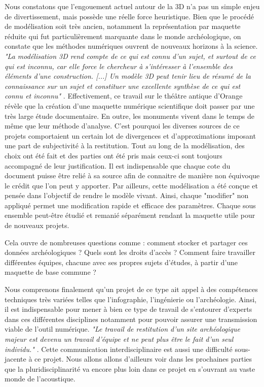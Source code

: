 Nous constatons que l'engouement actuel autour de la 3D n'a pas un simple enjeu de divertissement, mais possède une réelle force heuristique. Bien que le procédé de modélisation soit très ancien, notamment la représentation par maquette réduite qui fut particulièrement marquante dans le monde archéologique, on constate que les méthodes numériques ouvrent de nouveaux horizons à la science. \textit{"La modélisation 3D rend compte de ce qui est connu d’un sujet, et surtout de ce qui est inconnu, car elle force le chercheur à s’intéresser à l’ensemble des éléments d’une construction. [...] Un modèle 3D peut tenir lieu de résumé de la connaissance sur un sujet et constituer une excellente synthèse de ce qui est connu et inconnu"}  \cite{rocheleau}. Effectivement, ce travail sur le théâtre antique d'Orange révèle que la création d'une maquette numérique scientifique doit passer par une très large étude documentaire. En outre, les monuments vivent dans le temps de même que leur méthode d'analyse. C'est pourquoi les diverses sources de ce projets comportaient un certain lot de divergences et d'approximations imposant une part de subjectivité à la restitution. Tout au long de la modélisation, des choix ont été fait et des parties ont été pris mais ceux-ci sont toujours accompagné de leur justification. Il est indispensable que chaque cote du document puisse être relié à sa source afin de connaitre de manière non équivoque le crédit que l'on peut y apporter. 
Par ailleurs, cette modélisation a été conçue et pensée dans l'objectif de rendre le modèle vivant. Ainsi, chaque "modifier" non appliqué permet une modification rapide et efficace des paramètres. Chaque sous ensemble peut-être étudié et remanié séparément rendant la maquette utile pour de nouveaux projets.

Cela ouvre de nombreuses questions comme : comment stocker et partager ces données archéologiques ? Quels sont les droits d'accès ? Comment faire travailler différentes équipes, chacune avec ses propres sujets d'études, à partir d'une maquette de base commune ?

Nous comprenons finalement qu'un projet de ce type ait appel à des compétences techniques très variées telles que l'infographie, l'ingénierie ou l'archéologie. Ainsi, il est indispensable pour mener à bien ce type de travail de s'entourer d'experts dans ces différentes disciplines notamment pour pouvoir assurer une transmission viable de l'outil numérique. \textit{"Le travail de restitution d’un site archéologique majeur est devenu un travail d’équipe et ne peut plus être le fait d’un seul individu."} \cite{archeogrid}. Cette communication interdisciplinaire est aussi une difficulté sous-jacente à ce projet. Nous allons allons d'ailleurs voir dans les prochaines parties que la pluridisciplinarité va encore plus loin dans ce projet en s'ouvrant au vaste monde de l'acoustique. 
	
